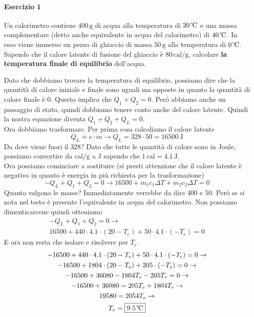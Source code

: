 \paragraph{Esercizio 1}
Un calorimetro contiene  $400\,\text{g}$ di acqua alla temperatura di $20\,\text{\textcelsius}$ e una 
massa complementare (detto anche equivalente in acqua del calorimetro) di $40\,\text{\textcelsius}$. 
In esso viene immerso un pezzo di ghiaccio di massa $50\,\text{g}$ alla temperatura di 
$0\,\text{\textcelsius}$. Sapendo che il calore latente di fusione del ghiaccio è $80\,\text{cal/g}$, 
calcolare \textbf{la temperatura finale di equilibrio} dell'acqua.
\divisor

Dato che dobbiamo trovare la temperatura di equilibrio, possiamo dire che la quantità di calore 
iniziale e finale sono uguali ma opposte in quanto la quantità di calore finale è $0$. Questo implica 
che $Q_1 + Q_2 = 0$. Però abbiamo anche un passaggio di stato, quindi dobbiamo tenere conto anche del
calore latente. Quindi la nostra equazione diventa $Q_1 + Q_2 + Q_L = 0$.\\[\baselineskip]
Ora dobbiamo trasformare. Per prima cosa calcoliamo il calore latente
\begin{equation*}
  Q_L = c\cdot m \rightarrow Q_L = 328\cdot50 = \underline{16500\,\text{J}}
\end{equation*}
Da dove viene fuori il $328$? Dato che tutte le quantità di calore sono in Joule, possiamo convertire
da cal/g a J sapendo che $1\,\text{cal} = 4.1\,\text{J}$.\\[\baselineskip]
Ora possiamo cominciare a sostituire (si presti attenzione che il calore latente è negativo in quanto
è energia in più richiesta per la trasformazione)
\begin{equation*}
  -Q_L + Q_1 + Q_2 = 0 \rightarrow 16500 + m_1c_1\Delta T + m_2c_2\Delta T = 0
\end{equation*}
Quanto valgono le masse? Immediatamente verrebbe da dire $400$ e $50$. Però se si nota nel testo è
presente l'equivalente in acqua del calorimetro. Non possiamo dimenticarcene quindi otteniamo
\begin{gather*}
  -Q_L + Q_1 + Q_2 = 0 \rightarrow \\
  16500 + 440\cdot4.1\cdot(20-T_e)+50\cdot4.1\cdot(-T_e) = 0
\end{gather*}
E ora non resta che isolare e risolvere per $T_e$.
\begin{gather*}
  -16500 + 440\cdot4.1\cdot(20-T_e)+50\cdot4.1\cdot(-T_e) = 0 \rightarrow \\
  -16500 + 1804\cdot(20-T_e)+205\cdot(-T_e) = 0 \rightarrow\\
  -16500 + 36080 - 1804T_e - 205T_e = 0 \rightarrow\\
  -16500 + 36080 = 205T_e + 1804T_e \rightarrow\\
  19580 = 2054T_e \rightarrow\\
  T_e = \boxed{9.5\,\text{\textcelsius}}
\end{gather*}

